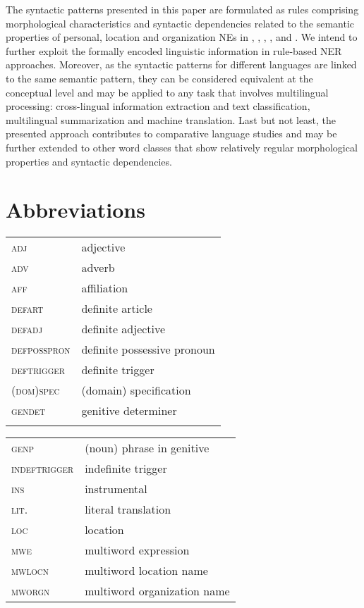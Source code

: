 \documentclass[output=paper]{langsci/langscibook}
\begin{document}
The syntactic patterns presented in this paper are formulated as rules
comprising morphological characteristics and syntactic dependencies
related to the semantic properties of personal, location and
organization NEs in , , , , and . We
intend to further exploit the formally encoded linguistic information
in rule-based NER approaches. Moreover, as the syntactic patterns for
different languages are linked to the same semantic pattern, they can
be considered equivalent at the conceptual level and may be applied to
any task that involves multilingual processing: cross-lingual
information extraction and text classification, multilingual
summarization and machine translation. Last but not least, the
presented approach contributes to comparative language studies and may
be further extended to other word classes that show relatively regular
morphological properties and syntactic dependencies.
 
\section*{Abbreviations}
\largerpage
 
\begin{tabularx}{.5\textwidth}{lQ}
\textsc{adj} & adjective \\
\textsc{adv} & adverb\\
\textsc{aff} & affiliation  \\
\textsc{defart} & definite article\\
\textsc{defadj} & definite adjective\\
\textsc{defposspron} & definite possessive pronoun \\
\textsc{deftrigger} & definite trigger \\
(\textsc{dom)spec} & (domain) specification \\
\textsc{gendet} & genitive determiner \\
\\
\end{tabularx}
\begin{tabularx}{.49\textwidth}{lQ}
 \textsc{genp}  &   (noun) phrase in genitive \\
\textsc{indeftrigger} & indefinite trigger \\
\textsc{ins} & instrumental \\
\textsc{lit.} &  literal translation \\
\textsc{loc}  & location \\
\textsc{mwe}  & multiword expression \\
\textsc{mwlocn}  & multiword location name  \\
\textsc{mworgn}  & multiword organization name \\
\end{tabularx}
\end{document}
